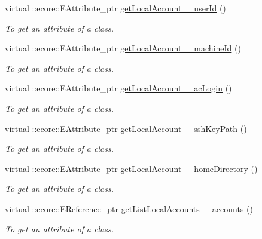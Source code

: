 \begin{DoxyCompactItemize}
virtual ::ecore::EAttribute\_\-ptr \hyperlink{classUMS__Data_1_1UMS__DataPackage_ad4dcfc0552b365e197e6a452cbd76cb2}{getLocalAccount\_\-\_\-userId} ()
\begin{DoxyCompactList}\small\item\em To get an attribute of a class. \item\end{DoxyCompactList}\item 
virtual ::ecore::EAttribute\_\-ptr \hyperlink{classUMS__Data_1_1UMS__DataPackage_a080ec66615c402327ffaca049c3658c0}{getLocalAccount\_\-\_\-machineId} ()
\begin{DoxyCompactList}\small\item\em To get an attribute of a class. \item\end{DoxyCompactList}\item 
virtual ::ecore::EAttribute\_\-ptr \hyperlink{classUMS__Data_1_1UMS__DataPackage_a8d17049f124902b12dc574260e67a320}{getLocalAccount\_\-\_\-acLogin} ()
\begin{DoxyCompactList}\small\item\em To get an attribute of a class. \item\end{DoxyCompactList}\item 
virtual ::ecore::EAttribute\_\-ptr \hyperlink{classUMS__Data_1_1UMS__DataPackage_ac1f4e4ed34271bc875916b8f9b83e179}{getLocalAccount\_\-\_\-sshKeyPath} ()
\begin{DoxyCompactList}\small\item\em To get an attribute of a class. \item\end{DoxyCompactList}\item 
virtual ::ecore::EAttribute\_\-ptr \hyperlink{classUMS__Data_1_1UMS__DataPackage_acb7cfc1d8dff6e82ed59c5e97fc9b347}{getLocalAccount\_\-\_\-homeDirectory} ()
\begin{DoxyCompactList}\small\item\em To get an attribute of a class. \item\end{DoxyCompactList}\item 
virtual ::ecore::EReference\_\-ptr \hyperlink{classUMS__Data_1_1UMS__DataPackage_ada882b0d1911065be0ce27023a6b6547}{getListLocalAccounts\_\-\_\-accounts} ()
\begin{DoxyCompactList}\small\item\em To get an attribute of a class. \item\end{DoxyCompactList}\item 

\end{DoxyCompactItemize}
